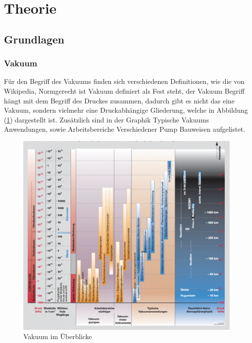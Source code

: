 \section{Theorie}
\label{sec:Theorie}

\subsection{Grundlagen}
\subsubsection*{Vakuum}
Für den Begriff des Vakuums finden sich verschiedenen Definitionen,
wie die von Wikipedia, \cite[Vakuum ist in der technischen Praxis ein Raum mit weitgehender Abwesenheit von Materie.]{dewiki}
Normgerecht ist Vakuum definiert als 
\cite[der Zustand eines Gases, 
wenn in einem Behälter der Druck des Gases 
und damit die Teilchenzahldichte niedriger ist als außerhalb oder wenn der Druck des Gases niedriger ist als 300 mbar,
d.h. kleiner als der niedrigste auf der Erdoberfläche vorkommende Atmosphärendruck.]{DIN} 
Fest steht, der Vakuum Begriff hängt mit dem Begriff des Druckes zusammen,
dadurch gibt es nicht das eine Vakuum, sondern vielmehr eine Druckabhängige Gliederung,
welche in Abbildung (\ref{fig:Vakuum}) dargestellt ist. 
Zusätzlich sind in der Graphik Typische Vakuums Anwendungen,
sowie Arbeitsbereiche Verschiedener Pump Bauweisen aufgelistet.
\begin{figure}[ht]
    \centering
    \includegraphics[width=\textwidth]{abb/Vakuum.png}
    \caption{Vakuum im Überblicke \cite{Pfeifer}}
    \label{fig:Vakuum}
\end{figure}

